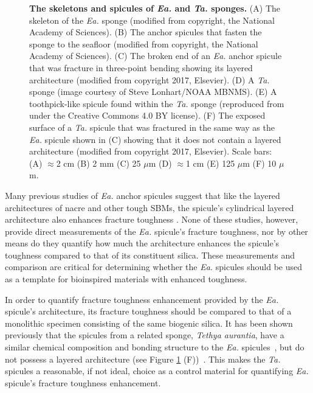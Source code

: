 \documentclass[12pt,onecolumn]{article}
\makeatletter
\newcommand{\TA}{\textit{Ta.\@}\xspace}
\newcommand{\EA}{\textit{Ea.\@}\xspace}
\makeatother
\begin{document}
\begin{bibunit}
\begin{figure}[ht!]
			\caption{\textbf{The skeletons and spicules of \EA and \TA sponges.} (A) The skeleton of the \EA sponge (modified from \cite{monn2015new} copyright, the National Academy of Sciences). (B) The anchor spicules that fasten the sponge to the seafloor (modified from \cite{monn2015new} copyright, the National Academy of Sciences). (C) The broken end of an \EA anchor spicule that was fracture in three-point bending showing its layered architecture (modified from \cite{monn2017enhanced} copyright 2017, Elsevier). (D) A \TA sponge (image courtesy of Steve Lonhart/NOAA MBNMS). (E) A toothpick-like spicule found within the \TA sponge (reproduced from \cite{monn2017new} under the Creative Commons 4.0 BY license). (F) The exposed surface of a \TA spicule that was fractured in the same way as the \EA spicule shown in (C) showing that it does not contain a layered architecture (modified from \cite{monn2017enhanced} copyright 2017, Elsevier). Scale bars: (A) $\approx$2 cm (B) 2 mm  (C) 25 $\mu$m (D) $\approx$1 cm  (E) 125 $\mu$m  (F) 10 $\mu$m. }
			\label{fig:EATA}
			\end{figure}

Many previous studies of \EA anchor spicules suggest that like the layered architectures of nacre and other tough SBMs, the spicule's cylindrical layered architecture also enhances fracture toughness \cite{mayer2005rigid,mayer2011new,walter2007mechanisms,kolednik2011bioinspired}. None of these studies, however, provide direct measurements of the \EA spicule's fracture toughness, nor by other means do they quantify how much the architecture enhances the spicule's toughness compared to that of its constituent silica. These measurements and comparison are critical for determining whether the \EA spicules should be used as a template for bioinspired materials with enhanced toughness. 



In order to quantify fracture toughness enhancement provided by the \EA spicule's architecture, its fracture toughness should be compared to that of a monolithic specimen consisting of the same biogenic silica. It has been shown previously that the spicules from a related sponge, \textit{Tethya aurantia}, have a similar chemical composition and bonding structure to the \EA spicules~\cite{weaver2010unifying}, but do not possess a layered architecture (see Figure \ref{fig:EATA} (F))~\cite{monn2017new}. This makes the \TA spicules a reasonable, if not ideal, choice as a control material for quantifying \EA spicule's fracture toughness enhancement. 
%


\end{bibunit}
\end{document}
